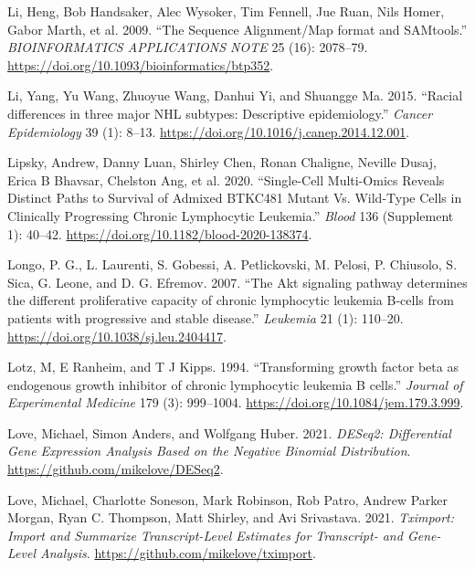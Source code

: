 \documentclass[11pt, a4paper, twosided]{book}
\newenvironment{CSLReferences}%
  {}%
  {\par}
\begin{document}
\begin{CSLReferences}{1}{0}
\leavevmode{}%
Li, Heng, Bob Handsaker, Alec Wysoker, Tim Fennell, Jue Ruan, Nils Homer, Gabor Marth, et al. 2009. {``{The Sequence Alignment/Map format and SAMtools}.''} \emph{BIOINFORMATICS APPLICATIONS NOTE} 25 (16): 2078--79. \url{https://doi.org/10.1093/bioinformatics/btp352}.

\leavevmode{}%
Li, Yang, Yu Wang, Zhuoyue Wang, Danhui Yi, and Shuangge Ma. 2015. {``{Racial differences in three major NHL subtypes: Descriptive epidemiology}.''} \emph{Cancer Epidemiology} 39 (1): 8--13. \url{https://doi.org/10.1016/j.canep.2014.12.001}.

\leavevmode{}%
Lipsky, Andrew, Danny Luan, Shirley Chen, Ronan Chaligne, Neville Dusaj, Erica B Bhavsar, Chelston Ang, et al. 2020. {``{Single-Cell Multi-Omics Reveals Distinct Paths to Survival of Admixed BTKC481 Mutant Vs. Wild-Type Cells in Clinically Progressing Chronic Lymphocytic Leukemia}.''} \emph{Blood} 136 (Supplement 1): 40--42. \url{https://doi.org/10.1182/blood-2020-138374}.

\leavevmode{}%
Longo, P. G., L. Laurenti, S. Gobessi, A. Petlickovski, M. Pelosi, P. Chiusolo, S. Sica, G. Leone, and D. G. Efremov. 2007. {``{The Akt signaling pathway determines the different proliferative capacity of chronic lymphocytic leukemia B-cells from patients with progressive and stable disease}.''} \emph{Leukemia} 21 (1): 110--20. \url{https://doi.org/10.1038/sj.leu.2404417}.

\leavevmode{}%
Lotz, M, E Ranheim, and T J Kipps. 1994. {``{Transforming growth factor beta as endogenous growth inhibitor of chronic lymphocytic leukemia B cells.}''} \emph{Journal of Experimental Medicine} 179 (3): 999--1004. \url{https://doi.org/10.1084/jem.179.3.999}.

\leavevmode{}%
Love, Michael, Simon Anders, and Wolfgang Huber. 2021. \emph{DESeq2: Differential Gene Expression Analysis Based on the Negative Binomial Distribution}. \url{https://github.com/mikelove/DESeq2}.

\leavevmode{}%
Love, Michael, Charlotte Soneson, Mark Robinson, Rob Patro, Andrew Parker Morgan, Ryan C. Thompson, Matt Shirley, and Avi Srivastava. 2021. \emph{Tximport: Import and Summarize Transcript-Level Estimates for Transcript- and Gene-Level Analysis}. \url{https://github.com/mikelove/tximport}.


\end{CSLReferences}
\end{document}
